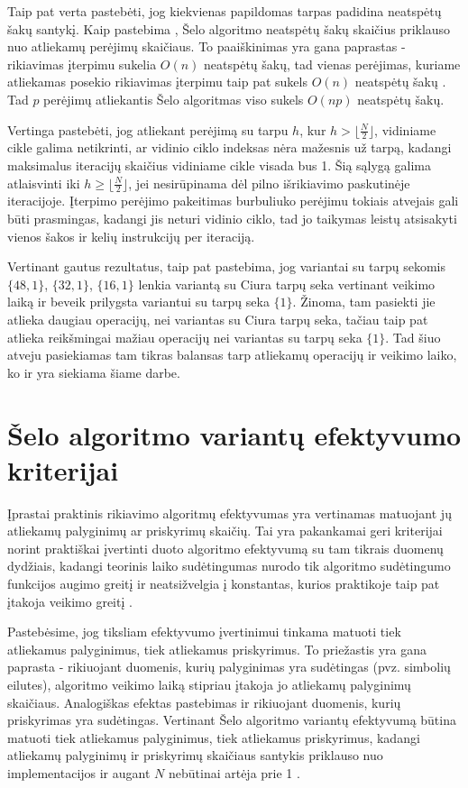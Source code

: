 \documentclass{VUMIFInfBakalaurinis}
\begin{document}
Taip pat verta pastebėti, jog kiekvienas papildomas tarpas padidina neatspėtų šakų santykį.
Kaip pastebima \cite{biggar2008experimental}, Šelo algoritmo neatspėtų šakų skaičius priklauso nuo atliekamų perėjimų skaičiaus.
To paaiškinimas yra gana paprastas - rikiavimas įterpimu sukelia $O(n)$ neatspėtų šakų,
tad vienas perėjimas, kuriame atliekamas posekio rikiavimas įterpimu taip pat sukels $O(n)$ neatspėtų šakų \cite{biggar2008experimental}.
Tad $p$ perėjimų atliekantis Šelo algoritmas viso sukels $O(np)$ neatspėtų šakų.

Vertinga pastebėti, jog atliekant perėjimą su tarpu $h$, kur $h > \lfloor\frac{N}{2}\rfloor$, vidiniame cikle galima netikrinti,
ar vidinio ciklo indeksas nėra mažesnis už tarpą, kadangi maksimalus iteracijų skaičius vidiniame cikle visada bus 1.
Šią sąlygą galima atlaisvinti iki $h \geq \lfloor\frac{N}{2}\rfloor$, jei nesirūpinama dėl pilno išrikiavimo paskutinėje iteracijoje.
Įterpimo perėjimo pakeitimas burbuliuko perėjimu tokiais atvejais gali būti prasmingas,
kadangi jis neturi vidinio ciklo, tad jo taikymas leistų atsisakyti vienos šakos ir kelių instrukcijų per iteraciją.  

Vertinant gautus rezultatus, taip pat pastebima, jog variantai su tarpų sekomis $\{48, 1\}$, $\{32, 1\}$, $\{16, 1\}$ lenkia variantą
su Ciura tarpų seka vertinant veikimo laiką ir beveik prilygsta variantui su tarpų seka $\{1\}$.
Žinoma, tam pasiekti jie atlieka daugiau operacijų, nei variantas su Ciura tarpų seka, tačiau taip pat atlieka reikšmingai mažiau operacijų nei variantas su tarpų seka $\{1\}$.
Tad šiuo atveju pasiekiamas tam tikras balansas tarp atliekamų operacijų ir veikimo laiko, ko ir yra siekiama šiame darbe.

\section{Šelo algoritmo variantų efektyvumo kriterijai}

Įprastai praktinis rikiavimo algoritmų efektyvumas yra vertinamas matuojant jų atliekamų palyginimų ar priskyrimų skaičių.
Tai yra pakankamai geri kriterijai norint praktiškai įvertinti duoto algoritmo efektyvumą su tam tikrais duomenų dydžiais,
kadangi teorinis laiko sudėtingumas nurodo tik algoritmo sudėtingumo funkcijos augimo greitį ir
neatsižvelgia į konstantas, kurios praktikoje taip pat įtakoja veikimo greitį \cite{biggar2005sorting}.

Pastebėsime, jog tiksliam efektyvumo įvertinimui tinkama matuoti tiek atliekamus palyginimus, tiek atliekamus priskyrimus.
To priežastis yra gana paprasta - rikiuojant duomenis, kurių palyginimas yra sudėtingas (pvz. simbolių eilutes),
algoritmo veikimo laiką stipriau įtakoja jo atliekamų palyginimų skaičiaus.
Analogiškas efektas pastebimas ir rikiuojant duomenis, kurių priskyrimas yra sudėtingas.
Vertinant Šelo algoritmo variantų efektyvumą būtina matuoti tiek atliekamus palyginimus, tiek atliekamus priskyrimus, kadangi
atliekamų palyginimų ir priskyrimų skaičiaus santykis priklauso nuo implementacijos ir augant $N$ nebūtinai artėja prie 1 \cite{Radavičius_Baranauskas_2013}.
\end{document}
